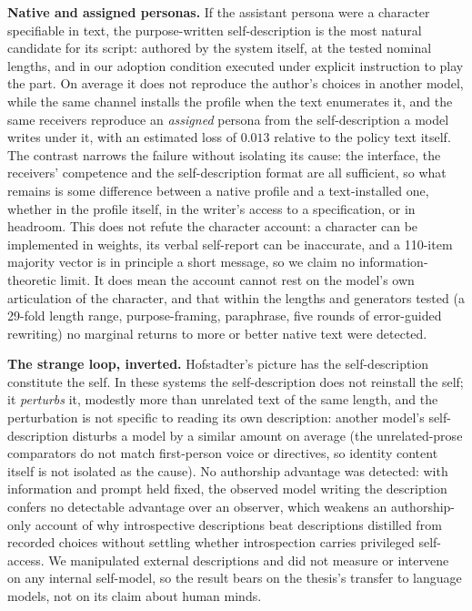 \documentclass[11pt]{article}
\begin{document}
\textbf{Native and assigned personas.} If the assistant persona were a
character specifiable in text, the purpose-written self-description is the
most natural candidate for its script: authored by the system itself, at
the tested nominal lengths, and in our adoption condition executed under
explicit instruction to play the part. On average it does not reproduce the
author's choices in another model, while the same channel installs the profile when
the text enumerates it, and the same receivers reproduce an \emph{assigned}
persona from the self-description a model writes under it, with an
estimated loss of $0.013$ relative to the policy text itself.
The contrast narrows the failure without isolating its cause: the interface,
the receivers' competence and the self-description format are all
sufficient, so what remains is some difference between a native profile and
a text-installed one, whether in the profile itself, in the writer's access
to a specification, or in headroom. This does
not refute the character account: a character can be implemented in weights,
its verbal self-report can be inaccurate, and a 110-item majority vector is
in principle a short message, so we claim no information-theoretic limit.
It does mean the account cannot rest on the model's own articulation of the
character, and that within the lengths and generators tested (a 29-fold
length range, purpose-framing, paraphrase, five rounds of error-guided
rewriting) no marginal returns to more or better native text were detected.

\textbf{The strange loop, inverted.} Hofstadter's picture has the
self-description constitute the self. In these systems the self-description
does not reinstall the self; it \emph{perturbs} it, modestly more than
unrelated text of the same length, and the perturbation is not specific to
reading its own description: another model's self-description disturbs a
model by a similar amount on average (the unrelated-prose comparators do
not match first-person voice or directives, so identity content itself is
not isolated as the cause). No authorship advantage was detected: with information and
prompt held fixed, the observed model writing the description confers no detectable
advantage over an observer, which weakens an authorship-only account of why
introspective descriptions beat descriptions distilled from recorded
choices without settling whether introspection carries privileged
self-access. We manipulated external descriptions and did not measure or
intervene on any internal self-model, so the result bears on the thesis's
transfer to language models, not on its claim about human minds.
\end{document}
